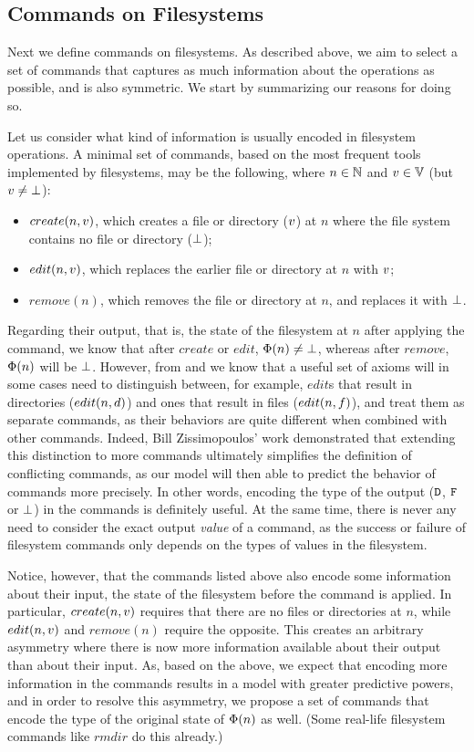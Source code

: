 
\subsection{Commands on Filesystems}


Next we define commands on filesystems.
As described above, we aim to select a set of commands
that captures as much information
about the operations as possible, and is also symmetric.
We start by summarizing our reasons for doing so.

Let us consider what kind of information is usually encoded in filesystem operations.
A minimal set of commands, based on the most frequent tools implemented by filesystems,
may be the following, where 
$n\in\mathbb{N}$ and $v\in\mathbb{V}$ (but $v\neq\bot$):
\begin{itemize}
\item $create(n,v)$, which creates a file or directory ($v$) at $n$
where the file system contains no file or directory ($\bot$);
\item $edit(n,v)$, which replaces the earlier file or directory at $n$ with $v$;
\item $remove(n)$, which removes the file or directory at $n$, and replaces it with $\bot$.
\end{itemize}
Regarding their output, that is, the state of the filesystem at $n$
after applying the command,
we know that after $create$ or $edit$, $\Phi(n)\neq\bot$, whereas after $remove$,
$\Phi(n)$ will be $\bot$. 
However, from \cite{NREC} and \cite{CBNR} we know that a useful set of axioms
will in some cases need to distinguish between, for example,
$edit$s that result in directories ($edit(n,d)$) and
ones that result in files ($edit(n,f)$), and treat them as separate commands,
as their behaviors are quite different when combined with other commands.
Indeed, Bill Zissimopoulos' work
demonstrated \cite{BZ}
that extending this distinction to more commands ultimately simplifies
the definition of conflicting commands, as our model will then able to predict the behavior of commands
more precisely.
In other words, encoding the type of the output ($\mathtt{D}$, $\mathtt{F}$ or $\bot$) in the commands is definitely useful.
At the same time, there is never any need to consider the
exact output \emph{value} of a command,
as the success or failure of filesystem commands only depends on the types of values in the filesystem.

Notice, however, that the commands listed above also encode some information about 
their input, the state of the filesystem
before the command is applied. In particular, $create(n,v)$ requires that there are no files
or directories at $n$, while $edit(n,v)$ and $remove(n)$ require the opposite.
This creates an arbitrary asymmetry where
there is now more information available about their output than about their input.
As, based on the above, we expect that encoding more information in the commands
results in a model with greater predictive powers,
and in order to resolve this asymmetry, 
we propose a set of commands that encode
the type of the original state of $\Phi(n)$ as well.
(Some real-life filesystem commands like $rmdir$ do this already.)

